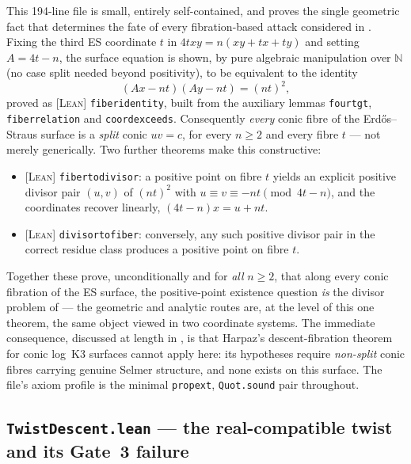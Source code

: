 \documentclass[11pt]{article}
\theoremstyle{plain}
\theoremstyle{definition}
\theoremstyle{remark}
\newcommand{\LEAN}{\textcolor{proved}{\textsc{[Lean]}}}
\newcommand{\file}[1]{\texttt{#1}}
\newcommand{\lean}[1]{\texttt{#1}}
\renewcommand{\_}{\textunderscore\allowbreak}
\newcommand{\N}{\mathbb{N}}
\begin{document}
This 194-line file is small, entirely self-contained, and proves the single geometric fact that
determines the fate of every fibration-based attack considered in . Fixing the
third ES coordinate $t$ in $4txy=n(xy+tx+ty)$ and setting $A=4t-n$, the surface equation is
shown, by pure algebraic manipulation over $\N$ (no case split needed beyond positivity), to be
equivalent to the identity
\[
(Ax-nt)(Ay-nt) = (nt)^2,
\]
proved as \LEAN{} \lean{fiber\_identity}, built from the auxiliary lemmas \lean{four\_t\_gt},
\lean{fiber\_relation} and \lean{coord\_exceeds}. Consequently \emph{every} conic fibre of the
Erd\H{o}s--Straus surface is a \emph{split} conic $uv=c$, for every $n\ge2$ and every fibre $t$
— not merely generically. Two further theorems make this constructive:
\begin{itemize}[leftmargin=1.4em]
  \item \LEAN{} \lean{fiber\_to\_divisor}: a positive point on fibre $t$ yields an explicit
        positive divisor pair $(u,v)$ of $(nt)^2$ with $u\equiv v\equiv -nt\pmod{4t-n}$, and the
        coordinates recover linearly, $(4t-n)x=u+nt$.
  \item \LEAN{} \lean{divisor\_to\_fiber}: conversely, any such positive divisor pair in the
        correct residue class produces a positive point on fibre $t$.
\end{itemize}
Together these prove, unconditionally and for \emph{all} $n\ge2$, that along every conic
fibration of the ES surface, the positive-point existence question \emph{is} the divisor
problem of  — the geometric and analytic routes are, at the level of this one
theorem, the same object viewed in two coordinate systems. The immediate consequence, discussed
at length in , is that Harpaz's descent-fibration theorem for conic log~K3
surfaces \cite{Harpaz2019} cannot apply here: its hypotheses require \emph{non-split} conic
fibres carrying genuine Selmer structure, and none exists on this surface. The file's axiom
profile is the minimal \texttt{propext}, \texttt{Quot.sound} pair throughout.

\subsection{\file{TwistDescent.lean} — the real-compatible twist and its Gate~3 failure}
\label{subsec:twistdescent}
\end{document}
